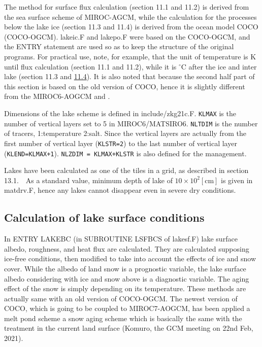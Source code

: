 The method for surface flux calculation (section 11.1 and 11.2) is derived from the sea surface scheme of MIROC-AGCM, while the calculation for the processes below the lake ice (section 11.3 and 11.4)
is derived from the ocean model COCO (COCO-OGCM). lakeic.F and lakepo.F were based on the COCO-OGCM, and the ENTRY statement are used so as to keep the structure of the original programs. For
practical use, note, for example, that the unit of temperature is \(\mathrm{K}\) until flux calculation (section 11.1 and 11.2), while it is \(\mathrm{^{\circ}C}\) after the ice and inter lake
(section 11.3 and \href{}{11.4}). It is also noted that because the second half part of this section is based on the old version of COCO, hence it is slightly different from the
MIROC6-AOGCM\citep{Tatebe2019-ow} and \citet{Hasumi2015-fs}.

Dimensions of the lake scheme is defined in include/zkg21c.F. \texttt{KLMAX} is the number of vertical layers set to 5 in MIROC6/MATSIRO6. \texttt{NLTDIM} is the number of tracers, 1:temperature
2:salt. Since the vertical layers are actually from the first number of vertical layer (\texttt{KLSTR=2}) to the last number of vertical layer (\texttt{KLEND=KLMAX+1}). \texttt{NLZDIM\ =\ KLMAX+KLSTR}
is also defined for the management.

Lakes have been calculated as one of the tiles in a grid, as described in section 13.1.　As a standard value, minimum depth of lake of \(10 \times 10^2 \mathrm{[cm]}\) is given in matdrv.F, hence any
lakes cannot disappear even in severe dry conditions.

\subsection{Calculation of lake surface conditions}\label{calculation-of-lake-surface-conditions}

In ENTRY LAKEBC (in SUBROUTINE LSFBCS of lakesf.F) lake surface albedo, roughness, and heat flux are calculated. They are calculated supposing ice-free conditions, then modified to take into account
the effects of ice and snow cover. While the albedo of land snow is a prognostic variable, the lake surface albedo considering with ice and snow above is a diagnostic variable. The aging effect of the
snow is simply depending on its temperature. These methods are actually same with an old version of COCO-OGCM\citep{Hasumi2015-fs}. The newest version of COCO, which is going to be coupled to
MIROC7-AOGCM, has been applied a melt pond scheme a snow aging scheme which is basically the same with the treatment in the current land surface (Komuro, the GCM meeting on 22nd Feb, 2021).

